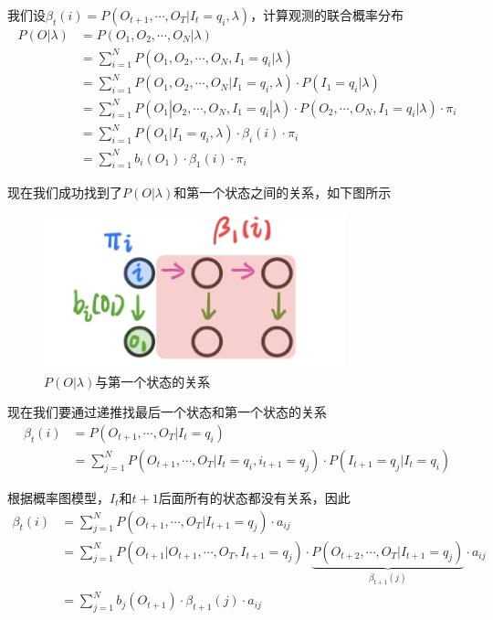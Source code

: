我们设$\beta_{t}(i)=P(O_{t+1},\cdots,O_{T}|I_t=q_i,\lambda)$，计算观测的联合概率分布
\begin{equation}
    \begin{aligned}
        P(O|\lambda)&=P(O_1,O_2,\cdots,O_N|\lambda)\\
        &=\sum_{i=1}^{N}P(O_1,O_2,\cdots,O_N,I_1=q_i|\lambda)\\
        &=\sum_{i=1}^{N}P(O_1,O_2,\cdots,O_N|I_1=q_i,\lambda)\cdot P(I_1=q_i|\lambda)\\
        &=\sum_{i=1}^{N}P(O_1|O_2,\cdots,O_N,I_1=q_i|\lambda)\cdot P(O_2,\cdots,O_N,I_1=q_i|\lambda)\cdot\pi_i\\
        &=\sum_{i=1}^{N}P(O_1|I_1=q_i,\lambda)\cdot \beta_i(i)\cdot \pi_i\\
        &=\sum_{i=1}^{N}b_i(O_1)\cdot \beta_1(i)\cdot \pi_i
    \end{aligned}
\end{equation}

现在我们成功找到了$P(O|\lambda)$和第一个状态之间的关系，如下图所示
\begin{figure}[H]
    \centering
    \includegraphics[scale=0.5]{figures/与第一个状态的关系.png}
    \caption{$P(O|\lambda)$与第一个状态的关系}
\end{figure}

现在我们要通过递推找最后一个状态和第一个状态的关系
\begin{equation}
    \begin{aligned}
        \beta_t(i)&=P(O_{t+1},\cdots,O_{T}|I_t=q_i)\\
        &=\sum_{j=1}^{N}P(O_{t+1},\cdots,O_{T}|I_t=q_i,i_{t+1}=q_j)\cdot P(I_{t+1}=q_j|I_t=q_i)
    \end{aligned}
\end{equation}

根据概率图模型，$I_t$和$t+1$后面所有的状态都没有关系，因此
\begin{equation}
    \begin{aligned}
        \beta_t(i)&=\sum_{j=1}^{N}P(O_{t+1},\cdots,O_T|I_{t+1}=q_j)\cdot a_{ij}\\
        &=\sum_{j=1}^{N}P(O_{t+1}|O_{t+1},\cdots,O_T,I_{t+1}=q_j)\cdot \underbrace{P(O_{t+2},\cdots,O_T|I_{t+1}=q_j)}_{\beta_{t+1}(j)}\cdot a_{ij}\\
        &=\sum_{j=1}^{N} b_j(O_{t+1})\cdot \beta_{t+1}(j)\cdot a_{ij}
     \end{aligned}
\end{equation}

